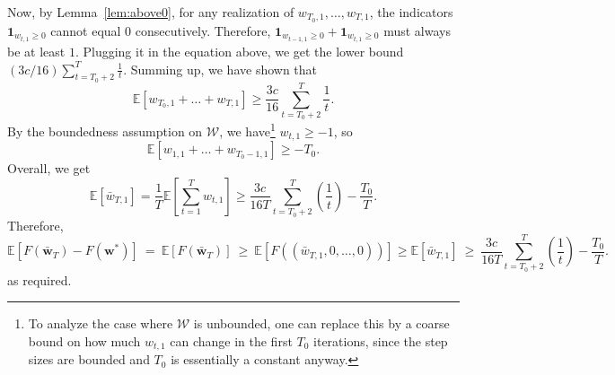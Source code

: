 \documentclass{article}
\newcommand{\E}{\mathbb{E}}
\newcommand{\bw}{\mathbf{w}}
\newcommand{\Wcal}{\mathcal{W}}
\newcommand{\lemref}[1]{Lemma~\ref{#1}}
\begin{document}
Now, by \lemref{lem:above0}, for any realization of $w_{T_0,1},\ldots,w_{T,1}$, the indicators $\mathbf{1}_{w_{t,1}\geq 0}$ cannot equal $0$ consecutively. Therefore, $\mathbf{1}_{w_{t-1,1}\geq 0}+\mathbf{1}_{w_{t,1}\geq 0}$ must always be at least $1$. Plugging it in the equation above, we get the lower bound $(3c/16)\sum_{t=T_0+2}^{T}\frac{1}{t}$. Summing up, we have shown that
\[
\E[w_{T_0,1}+\ldots+w_{T,1}] \geq \frac{3c}{16}\sum_{t=T_0+2}^{T}\frac{1}{t}.
\]
By the boundedness assumption on $\Wcal$, we have\footnote{To analyze the case where $\Wcal$ is unbounded, one can replace this by a coarse bound on how much $w_{t,1}$ can change in the first $T_0$ iterations, since the step sizes are bounded and $T_0$ is essentially a constant anyway.} $w_{t,1}\geq -1$, so
\[
\E[w_{1,1}+\ldots+w_{T_0-1,1}] \geq -T_0.
\]
Overall, we get
\[
\E[\bar{w}_{T,1}] = \frac{1}{T}\E\left[\sum_{t=1}^{T}w_{t,1}\right] \geq
\frac{3c}{16 T}\sum_{t=T_0+2}^{T}\left(\frac{1}{t}\right)-\frac{T_0}{T}.
\]
Therefore,
\[
\E\left[F(\bar{\bw}_{T})-F(\bw^{*})\right] ~=~ \E\left[F(\bar{\bw}_{T})\right] ~\geq~ \E\left[F((\bar{w}_{T,1},0,\ldots,0))\right] \geq
\E\left[\bar{w}_{T,1}\right] ~\geq~ \frac{3c}{16 T}\sum_{t=T_0+2}^{T}\left(\frac{1}{t}\right)-\frac{T_0}{T}.
\]
as required.
\end{document}
